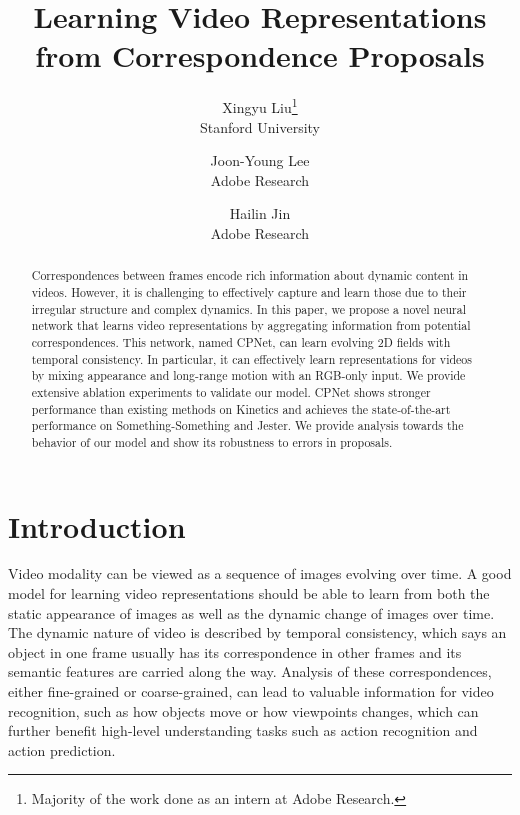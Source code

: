 \documentclass[10pt,twocolumn,letterpaper]{article}
\begin{document}
\title{Learning Video Representations from Correspondence Proposals}

\author{Xingyu Liu\thanks{Majority of the work done as an intern at Adobe Research.} \\ Stanford University
\and
Joon-Young Lee \\ Adobe Research
\and
Hailin Jin \\ Adobe Research
}

\maketitle


\begin{abstract}
Correspondences between frames encode rich information about dynamic content in videos. 
However, it is challenging to effectively capture and learn those due to their irregular structure and complex dynamics.
In this paper, we propose a novel neural network that learns video representations by aggregating information from potential correspondences.
This network, named CPNet, can learn evolving 2D fields with temporal consistency. In particular, it can effectively learn representations for videos by mixing appearance and long-range motion with an RGB-only input.
We provide extensive ablation experiments to validate our model. 
CPNet shows stronger performance than existing methods on Kinetics and achieves the state-of-the-art performance on Something-Something and Jester. We provide analysis towards the behavior of our model and show its robustness to errors in proposals.
\end{abstract}



\vspace{-2ex}
\section{Introduction}





Video modality can be viewed as a sequence of images evolving over time. A good model for learning video representations should be able to learn from both the static appearance of images as well as the dynamic change of images over time. 
The dynamic nature of video is described by temporal consistency, 
which says an object in one frame usually has its correspondence in other frames and its semantic features are carried along the way.
Analysis of these correspondences, either fine-grained or coarse-grained, can lead to valuable information for video recognition, such as how objects move or how viewpoints changes, which can further benefit high-level understanding tasks such as action recognition and action prediction.
\end{document}
